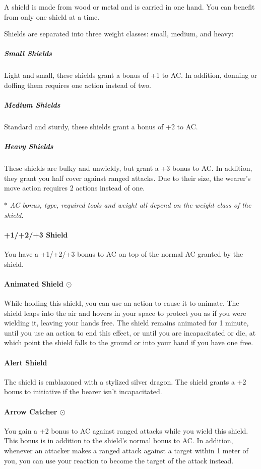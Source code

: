     A shield is made from wood or metal and is carried in one hand.
    You can benefit from only one shield at a time.

    Shields are separated into three weight classes: small, medium, and heavy:
    \subparagraph{Small Shields}
        Light and small, these shields grant a bonus of +1 to AC.
        In addition, donning or doffing them requires one action instead of two.
    \subparagraph{Medium Shields}
        Standard and sturdy, these shields grant a bonus of +2 to AC.
    \subparagraph{Heavy Shields}
        These shields are bulky and unwieldy, but grant a +3 bonus to AC.
        In addition, they grant you half cover against ranged attacks.
        Due to their size, the wearer's move action requires 2 actions instead of one.

    $\ast$ \textit{AC bonus, type, required tools and weight all depend on the weight class of the shield.}

    \paragraph{+1/+2/+3 Shield}
        You have a +1/+2/+3 bonus to AC on top of the normal AC granted by the shield.
    \paragraph{Animated Shield $\odot$}
        While holding this shield, you can use an action to cause it to animate.
        The shield leaps into the air and hovers in your space to protect you as if you were wielding it, leaving your hands free.
        The shield remains animated for 1 minute, until you use an action to end this effect, or until you are incapacitated or die, at which point the shield falls to the ground or into your hand if you have one free.
    \paragraph{Alert Shield}
        The shield is emblazoned with a stylized silver dragon.
        The shield grants a +2 bonus to initiative if the bearer isn't incapacitated.
    \paragraph{Arrow Catcher $\odot$}
        You gain a +2 bonus to AC against ranged attacks while you wield this shield.
        This bonus is in addition to the shield's normal bonus to AC.
        In addition, whenever an attacker makes a ranged attack against a target within 1 meter of you, you can use your reaction to become the target of the attack instead.
